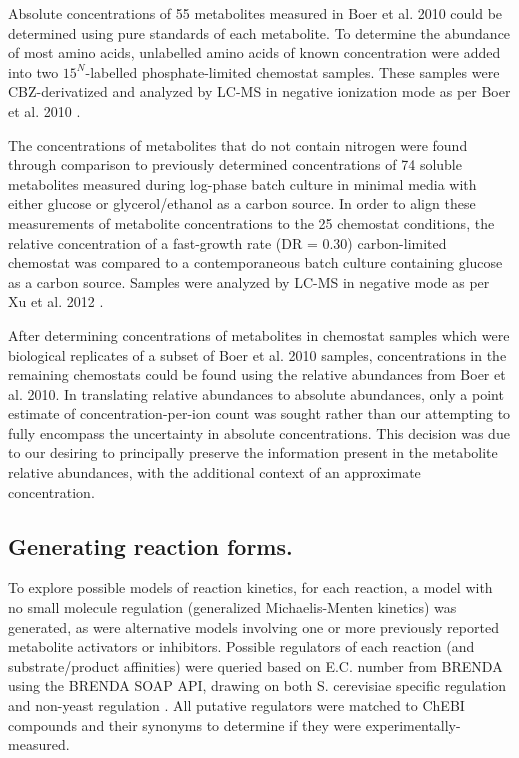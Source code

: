 Absolute concentrations of 55 metabolites measured in Boer et al. 2010 could be determined using pure standards of each metabolite.  To determine the abundance of most amino acids, unlabelled amino acids of known concentration were added into two $15^{N}$-labelled phosphate-limited chemostat samples.  These samples were CBZ-derivatized and analyzed by LC-MS in negative ionization mode as per Boer et al. 2010 \cite{Boer:2010fb}.

The concentrations of metabolites that do not contain nitrogen were found through comparison to previously determined concentrations of 74 soluble metabolites measured during log-phase batch culture in minimal media with either glucose or glycerol/ethanol as a carbon source.  In order to align these measurements of metabolite concentrations to the 25 chemostat conditions, the relative concentration of a fast-growth rate (DR = 0.30) carbon-limited chemostat was compared to a contemporaneous batch culture containing glucose as a carbon source.  Samples were analyzed by LC-MS in negative mode as per Xu et al. 2012 \cite{Xu:2012gg}.

After determining concentrations of metabolites in chemostat samples which were biological replicates of a subset of Boer et al. 2010 samples, concentrations in the remaining chemostats could be found using the relative abundances from Boer et al. 2010.  In translating relative abundances to absolute abundances, only a point estimate of concentration-per-ion count was sought rather than our attempting to fully encompass the uncertainty in absolute concentrations.  This decision was due to our desiring to principally preserve the information present in the metabolite relative abundances, with the additional context of an approximate concentration.

\subsection*{Generating reaction forms.}

To explore possible models of reaction kinetics, for each reaction, a model with no small molecule regulation (generalized Michaelis-Menten kinetics) was generated, as were alternative models involving one or more previously reported metabolite activators or inhibitors.  Possible regulators of each reaction (and substrate/product affinities) were queried based on E.C. number from BRENDA using the BRENDA SOAP API, drawing on both S. cerevisiae specific regulation and non-yeast regulation \cite{Scheer:2011df}.  All putative regulators were matched to ChEBI compounds \cite{Degtyarenko:2008hx} and their synonyms to determine if they were experimentally-measured.

